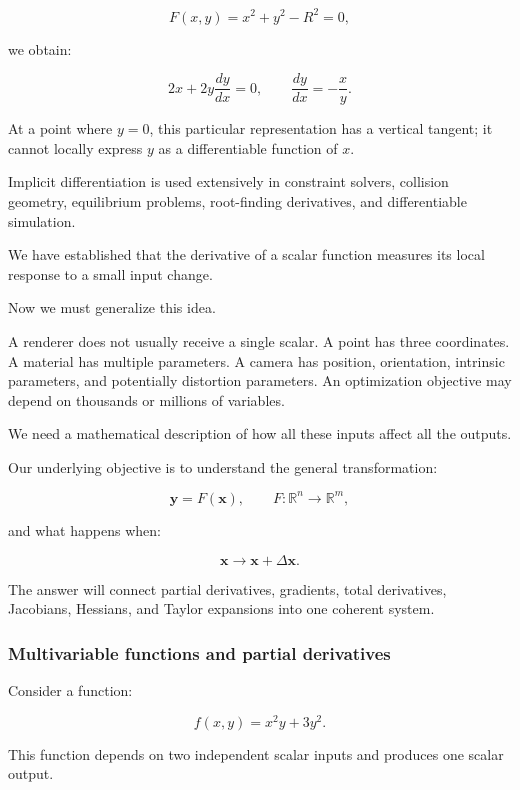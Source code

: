 \[
F(x,y)=x^2+y^2-R^2=0,
\]

we obtain:

\[
2x+2y\frac{dy}{dx}=0, \qquad \frac{dy}{dx}=-\frac xy.
\]

At a point where \(y=0\), this particular representation has a vertical tangent; it cannot locally express \(y\) as a differentiable function of \(x\).

Implicit differentiation is used extensively in constraint solvers, collision geometry, equilibrium problems, root-finding derivatives, and differentiable simulation.

We have established that the derivative of a scalar function measures its local response to a small input change.

Now we must generalize this idea.

A renderer does not usually receive a single scalar. A point has three coordinates. A material has multiple parameters. A camera has position, orientation, intrinsic parameters, and potentially distortion parameters. An optimization objective may depend on thousands or millions of variables.

We need a mathematical description of how all these inputs affect all the outputs.

Our underlying objective is to understand the general transformation:

\[
\mathbf y=F(\mathbf x), \qquad F:\mathbb R^n\rightarrow\mathbb R^m,
\]

and what happens when:

\[
\mathbf x\longrightarrow\mathbf x+\Delta\mathbf x.
\]

The answer will connect partial derivatives, gradients, total derivatives, Jacobians, Hessians, and Taylor expansions into one coherent system.

\subsubsection{Multivariable functions and partial derivatives}\label{02-foundations-ii-ch021-multivariable-functions-and-partial-derivatives}

\hypertarget{02-foundations-ii-ch021-multivariable-functions-and-partial-derivatives}{}

Consider a function:

\[
f(x,y)=x^2y+3y^2.
\]

This function depends on two independent scalar inputs and produces one scalar output.

